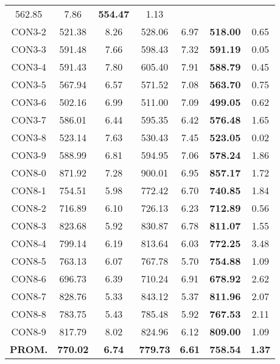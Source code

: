 \begin{table}[ht]
\begin{tabular}{c c c c c c c}
562.85 & 7.86 & \bf{554.47} & 
1.13\\CON3-2 & 521.38 & 8.26 & 
528.06 & 6.97 & \bf{518.00} & 
0.65\\CON3-3 & 591.48 & 7.66 & 
598.43 & 7.32 & \bf{591.19} & 
0.05\\CON3-4 & 591.43 & 7.80 & 
605.40 & 7.91 & \bf{588.79} & 
0.45\\CON3-5 & 567.94 & 6.57 & 
571.52 & 7.08 & \bf{563.70} & 
0.75\\CON3-6 & 502.16 & 6.99 & 
511.00 & 7.09 & \bf{499.05} & 
0.62\\CON3-7 & 586.01 & 6.44 & 
595.35 & 6.42 & \bf{576.48} & 
1.65\\CON3-8 & 523.14 & 7.63 & 
530.43 & 7.45 & \bf{523.05} & 
0.02\\CON3-9 & 588.99 & 6.81 & 
594.95 & 7.06 & \bf{578.24} & 
1.86\\CON8-0 & 871.92 & 7.28 & 
900.01 & 6.95 & \bf{857.17} & 
1.72\\CON8-1 & 754.51 & 5.98 & 
772.42 & 6.70 & \bf{740.85} & 
1.84\\CON8-2 & 716.89 & 6.10 & 
726.13 & 6.23 & \bf{712.89} & 
0.56\\CON8-3 & 823.68 & 5.92 & 
830.87 & 6.78 & \bf{811.07} & 
1.55\\CON8-4 & 799.14 & 6.19 & 
813.64 & 6.03 & \bf{772.25} & 
3.48\\CON8-5 & 763.13 & 6.07 & 
767.78 & 5.70 & \bf{754.88} & 
1.09\\CON8-6 & 696.73 & 6.39 & 
710.24 & 6.91 & \bf{678.92} & 
2.62\\CON8-7 & 828.76 & 5.33 & 
843.12 & 5.37 & \bf{811.96} & 
2.07\\CON8-8 & 783.75 & 5.43 & 
785.48 & 5.92 & \bf{767.53} & 
2.11\\CON8-9 & 817.79 & 8.02 & 
824.96 & 6.12 & \bf{809.00} & 
1.09\\\bf{PROM.} & 
\bf{770.02} & \bf{6.74} & \bf{779.73} & \bf{6.61} & \bf{758.54} & \bf{1.37}\\[1ex]\hline
\end{tabular}
\label{table:nonlin}
\end{table} \clearpage
